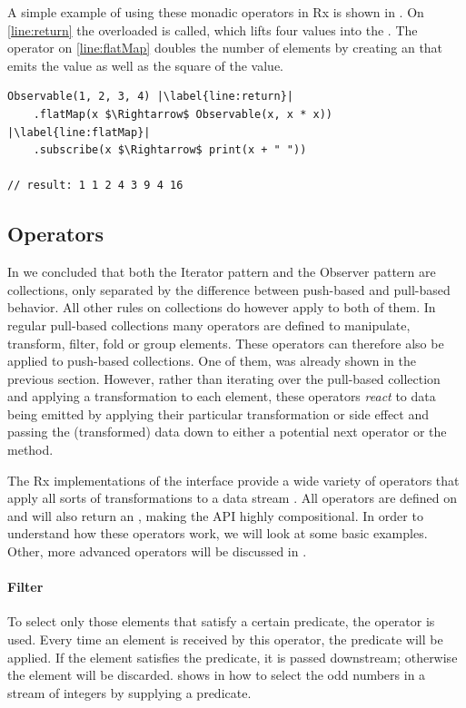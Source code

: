 A simple example of using these monadic operators in Rx is shown in . On \cref{line:return} the overloaded  is called, which lifts four values into the \obs. The  operator on \cref{line:flatMap} doubles the number of elements by creating an \obs that emits the value as well as the square of the value.

\begin{minipage}{\linewidth}
\begin{lstlisting}[style=ScalaStyle, caption={Monad operators in Rx}, label={lst:monad-in-rx}]
Observable(1, 2, 3, 4) |\label{line:return}|
    .flatMap(x $\Rightarrow$ Observable(x, x * x)) |\label{line:flatMap}|
    .subscribe(x $\Rightarrow$ print(x + " "))

// result: 1 1 2 4 3 9 4 16
\end{lstlisting}
\end{minipage}

\subsection{Operators}
\label{subsec:operators}
In  we concluded that both the Iterator pattern and the Observer pattern are collections, only separated by the difference between push-based and pull-based behavior. All other rules on collections do however apply to both of them. In regular pull-based collections many operators are defined to manipulate, transform, filter, fold or group elements. These operators can therefore also be applied to push-based collections. One of them,  was already shown in the previous section. However, rather than iterating over the pull-based collection and applying a transformation to each element, these operators \emph{react} to data being emitted by applying their particular transformation or side effect and passing the (transformed) data down to either a potential next operator or the  method.

The Rx implementations of the \obs interface provide a wide variety of operators that apply all sorts of transformations to a data stream \cite{rx-api}. All operators are defined on \obs and will also return an \obs, making the API highly compositional. In order to understand how these operators work, we will look at some basic examples. Other, more advanced operators will be discussed in .

\paragraph{Filter}To select only those elements that satisfy a certain predicate, the operator  is used. Every time an element is received by this operator, the predicate  will be applied. If the element satisfies the predicate, it is passed downstream; otherwise the element will be discarded.  shows in  how to select the odd numbers in a stream of integers by supplying a predicate.

